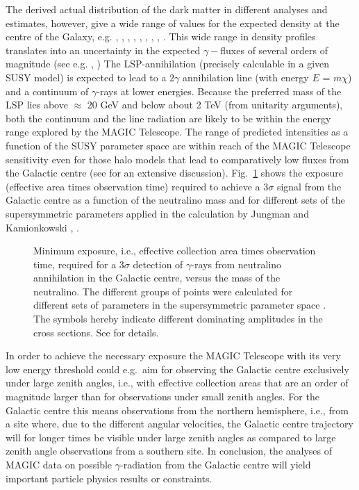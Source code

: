 The derived actual distribution of the dark matter in different analyses and
estimates, however, give a wide range of values for the expected density at
the centre of the Galaxy, e.g. \cite{ipser:87}, \cite{berezinsky:92}, 
\cite{crone:94}, \cite{flores:94}, \cite{fukushige:96}, \cite{gates:95}, 
\cite{gates:96}, \cite{navarro:95}, \cite{navarro:96}. This wide range in density
profiles translates into an uncertainty in the expected $\gamma -$fluxes of 
several orders of magnitude (see e.g. \cite{bergstroem:94}, \cite{buckley:95})
The LSP-annihilation (precisely calculable in a given SUSY model) is
expected to lead to a 2$\gamma $ annihilation line (with energy $E$ = $m\chi 
$) and a continuum of $\gamma $-rays at lower energies. Because the
preferred mass of the LSP lies above $\approx $ 20 GeV and below about 2 TeV
(from unitarity arguments), both the continuum and the line radiation are
likely to be within the energy range explored by the MAGIC Telescope. The
range of predicted intensities as a function of the SUSY parameter space are
within reach of the MAGIC Telescope sensitivity even for those halo models
that lead to comparatively low fluxes from the Galactic centre (see \cite{buckley:95} 
for an extensive discussion). 
Fig.~\ref{fig-neutralino} shows the 
exposure (effective area times observation
time) required to achieve a 3$\sigma$ signal from the Galactic centre
as a function of the neutralino mass and for different sets 
of the supersymmetric parameters applied in the calculation 
by Jungman and Kamionkowski \cite{jungman:94}, \cite{jungman:95}.

\begin{figure} \leavevmode \centering
\epsfxsize=11cm
\label{fig-neutralino}
\caption{Minimum exposure,
i.e., effective collection area times observation time,
required for a 3$\sigma$ detection of $\gamma$-rays
from neutralino annihilation in the Galactic centre, versus the mass of
the neutralino.
The different groups of points were calculated for
different sets of parameters in the 
supersymmetric parameter space \cite{jungman:95}.
The symbols hereby indicate different dominating amplitudes
in the cross sections. See \cite{jungman:95} for details.} 
\end{figure}

In order to achieve the necessary exposure the MAGIC Telescope with its
very low energy threshold could e.g.\, aim for observing the
Galactic centre exclusively under
large zenith angles, i.e., with effective collection areas
that are an order of magnitude larger than for observations 
under small zenith angles. For the Galactic centre this means
observations from
the northern hemisphere, i.e., from a site
where, due to the different angular velocities,
the Galactic centre trajectory will 
for longer times be visible under large zenith angles
as compared to large zenith angle observations from a southern site.
In conclusion, the analyses of MAGIC data on
possible $\gamma$-radiation from the Galactic centre will yield
important particle physics results or constraints.

